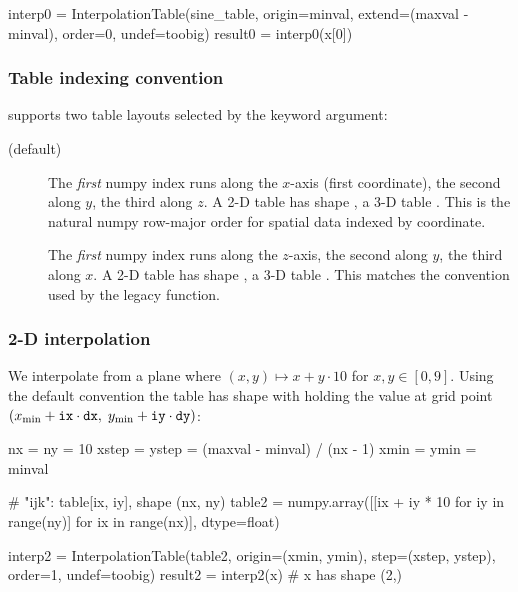 \begin{python}
interp0 = InterpolationTable(sine_table, origin=minval,
                             extend=(maxval - minval), order=0, undef=toobig)
result0 = interp0(x[0])
\end{python}

\subsubsection{Table indexing convention}
\label{sec:table_indexing}

 supports two table layouts selected by the
 keyword argument:

\begin{description}
  \item[ (default)] The \emph{first} numpy index runs along the
    $x$-axis (first coordinate), the second along $y$, the third along $z$.
    A 2-D table has shape , a 3-D table .
    This is the natural numpy row-major order for spatial data indexed by
    coordinate.
  \item[] The \emph{first} numpy index runs along the $z$-axis,
    the second along $y$, the third along $x$.
    A 2-D table has shape , a 3-D table .
    This matches the convention used by the legacy 
    function.
\end{description}

\subsubsection{2-D interpolation}

We interpolate from a plane where $(x,y)\mapsto x + y\cdot10$ for
$x,y\in[0,9]$.
Using the default  convention the table has shape
 with  holding the value at grid
point $(x_{\min}+\texttt{ix}\cdot\texttt{dx},\; y_{\min}+\texttt{iy}\cdot\texttt{dy})$:

\begin{python}
nx = ny = 10
xstep = ystep = (maxval - minval) / (nx - 1)
xmin = ymin = minval

# "ijk": table[ix, iy], shape (nx, ny)
table2 = numpy.array([[ix + iy * 10 for iy in range(ny)]
                       for ix in range(nx)], dtype=float)

interp2 = InterpolationTable(table2, origin=(xmin, ymin),
                             step=(xstep, ystep), order=1, undef=toobig)
result2 = interp2(x)   # x has shape (2,)
\end{python}

